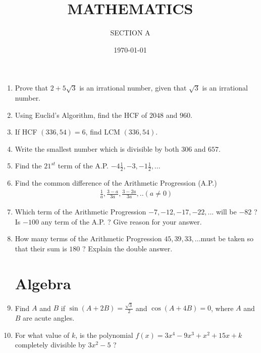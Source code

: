 \documentclass[2pt,-letter paper]{article}
\title{MATHEMATICS}
\author{SECTION A}
\date{\today}
\providecommand{\brak}[1]{\ensuremath{\left(#1\right)}}
\begin{document}
\maketitle

\begin{enumerate}

\section{Discrete}

\item Prove that $2+5\sqrt{3}$ is an irrational number, given that $\sqrt{3}$ is an irrational number.

\item Using Euclid's Algorithm, find the HCF of $2048$ and $960$.

\item If HCF $\brak{336, 54} = 6$, find LCM $\brak{336, 54}$.

\item Write the smallest number which is divisible by both $306$ and $657$.

\item Find the $21^{st}$ term of the A.P. $-4 \frac{1}{2},-3,-1\frac{1}{2},...$

\item Find the common difference of the Arithmetic Progression (A.P.) 
\begin{align*}
\frac{1}{a} , \frac{3-a}{3a},\frac{3-2a}{3a} , . . (a \neq 0)
\end{align*}

\item Which term of the Arithmetic Progression $-7, -12, -17, -22, ... $ will be $-82$ ? Is $-100$ any term of the A.P. ? Give reason for your answer.

\item How many terms of the Arithmetic Progression $45, 39, 33, ... $must be taken so that their sum is $180$ ? Explain the double answer.


\section{Algebra}


\item Find $A$ and $B$ if $\sin \brak{A + 2B}=\frac{\sqrt{3}}{2}$ and $\cos \brak{A + 4B} = 0$, where $A$ and $B$ are acute angles.

\item For what value of $k$, is the polynomial $f\brak{x} = 3x^4-9x^3+x^2+15x+k$ completely divisible by $3x^2 - 5$ ?


\end{enumerate}
\end{document}
